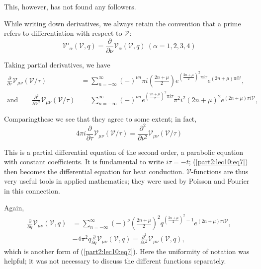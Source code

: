This, however, has not found any followers.

While writing down derivatives, we always retain the convention that a
prime refers to differentiation with respect to $\mathscr{V}$:
$$
\mathscr{V}'_\alpha (\mathscr{V}, q) = \frac{\partial}{\partial \nu}
\mathscr{V}_\alpha (\mathscr{V}, q) ~(\alpha=1, 2, 3, 4)
$$

Taking partial derivatives, we have
\begin{align*}
  \frac{\partial}{\partial \tau} \mathscr{V}_{\mu \nu}
  (\mathscr{V}/\tau) & = \sum^\infty_{n=- \infty} (-)^{\nu n} \pi i
  \left(\frac{2n+ \mu}{2}\right) e^{\left(\frac{2n+\mu}{2}\right)^2
    \pi i \tau} e^{(2n + \mu)\pi i \mathscr{V}},\\
    \text{and} \qquad   \frac{\partial^2}{\partial \mathscr{V}^2}
    \mathscr{V}_{\mu \nu} 
  (\mathscr{V}/\tau) & = \sum^\infty_{n=- \infty}(-)^{\nu n} 
  e^{\left(\frac{2n+ \mu}{2}\right)^2 \pi i \tau} \pi^2 i^2 (2n +
  \mu)^2 e^{(2n +\mu)\pi i \mathscr{V}},\qquad 
\end{align*}

Comparing\pageoriginale  these we see that they agree to some extent;
in fact,
\begin{equation*}
  4 \pi i \frac{\partial}{\partial \tau} \mathscr{V}_{\mu \nu}
  (\mathscr{V}/\tau)= \frac{\partial^2}{\partial \nu^2}
  \mathscr{V}_{\mu \nu} (\mathscr{V}/\tau) \tag{7}\label{part2:lec10:eq7}
\end{equation*}

This is a partial differential equation of the
second order, a parabolic equation with constant coefficients. It is
fundamental to write $i \tau=- t$; (\ref{part2:lec10:eq7}) then becomes the differential
equation for heat conduction. $\mathscr{V}$-functions are thus very
useful tools in applied mathematics; they were used by Poisson and
Fourier in this connection. 

Again, 
\begin{align*}
  \frac{\partial}{\partial q} \mathscr{V}_{\mu \nu}
  (\mathscr{V}, q) & = \sum^\infty_{n=- \infty} (-)^{\nu} 
  \left(\frac{2n+ \mu}{2}\right)^2 q^{\left(\frac{2n+\mu}{2}\right)^2
    -1} e^{(2n+\mu) \pi i \mathscr{V}},\\ 
  & - 4 \pi^2 q \frac{\partial}{\partial q} \mathscr{V}_{\mu \nu}
  (\mathscr{V}, q)= \frac{\partial^2}{\partial \nu^2} \mathscr{V}_{\mu
    \nu} (\mathscr{V}, q), \tag{8}
\end{align*}
which is another form of (\ref{part2:lec10:eq7}). Here the uniformity
of notation was 
helpful; it was not necessary to discuss the different functions
separately.

